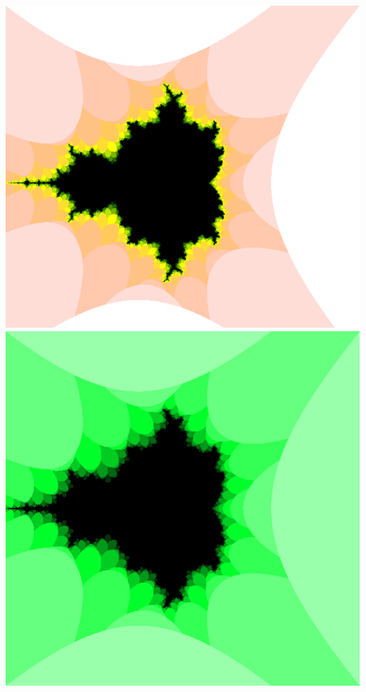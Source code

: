 \documentclass[../r.tex]{subfiles}
\begin{document}
\noindent
\includegraphics[scale=0.15]{../TAing/mandel/dark.png}
\includegraphics[scale=0.15]{../TAing/mandel/green.png}
\end{document}
